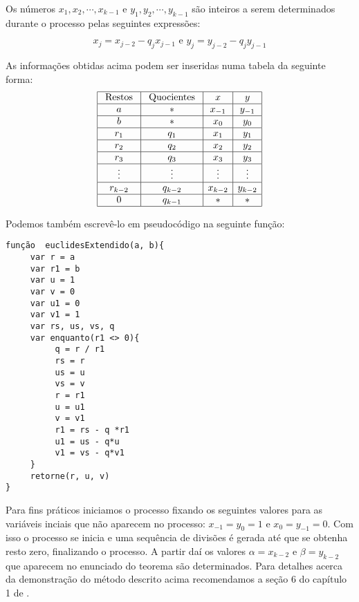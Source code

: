 Os n\'{u}meros $x_{1}, x_{2}, \cdots, x_{k-1}$ e $y_{1}, y_{2}, \cdots, y_{k-1}$ s\~{a}o inteiros a
serem determinados durante o processo pelas seguintes express\~{o}es:

$$x_{j}=x_{j-2}-q_{j}x_{j-1}\textrm{ \ \ e \ \ }  y_{j}=y_{j-2}-q_{j}y_{j-1}$$

As informa\c{c}\~{o}es obtidas acima podem ser inseridas numa tabela da seguinte forma:
\[
\begin{array}{|c|c|c|c|}\hline
\textrm{ Restos } & \textrm{ Quocientes } & x       & y \\ \hline
				a 	      & \ast     							& x_{-1}  & y_{-1} \\ \hline
				b  			  & \ast     							& x_{0}   & y_{0} \\ \hline
				r_{1}     & q_{1}   					 	  & x_{1}   & y_{1} \\ \hline
				r_{2}     & q_{2}    							& x_{2}   & y_{2} \\ \hline
				r_{3}     & q_{3}    							& x_{3}   & y_{3} \\ \hline  
				\vdots    & \vdots   							& \vdots  & \vdots \\ \hline
				r_{k-2}   & q_{k-2}  							& x_{k-2} & y_{k-2} \\ \hline
				0         & q_{k-1}  							& \ast    & \ast    \\ \hline
\end{array}
\]

Podemos tamb\'em escrev\^e-lo em pseudoc\'odigo na seguinte fun\c{c}\~ao:

\begin{verbatim}
função  euclidesExtendido(a, b){
     var r = a
     var r1 = b
     var u = 1
     var v = 0
     var u1 = 0
     var v1 = 1
     var rs, us, vs, q
     var enquanto(r1 <> 0){
          q = r / r1
          rs = r
          us = u
          vs = v
          r = r1
          u = u1
          v = v1
          r1 = rs - q *r1
          u1 = us - q*u
          v1 = vs - q*v1
     }
     retorne(r, u, v)
}
\end{verbatim}


Para fins pr\'{a}ticos iniciamos o processo fixando os seguintes valores para as vari\'{a}veis inciais
que n\~{a}o aparecem no processo: $x_{-1}=y_{0}=1$ e $x_{0}=y_{-1}=0$. Com isso o processo se inicia e 
uma sequ\^{e}ncia de divis\~{o}es \'{e} gerada at\'{e} que se obtenha resto zero, finalizando o processo. 
A partir da\'{i} os valores $\alpha=x_{k-2}$ e $\beta=y_{k-2}$ que aparecem no 
enunciado do teorema s\~{a}o determinados. Para detalhes acerca da demonstra\c{c}\~{a}o do m\'{e}todo descrito acima recomendamos 
a se\c{c}\~{a}o 6 do cap\'{i}tulo 1 de \cite{cou:2014}. 

